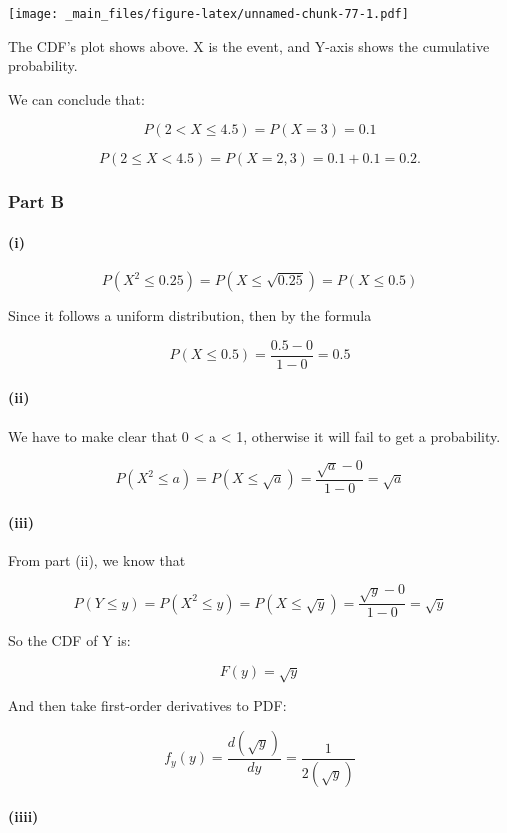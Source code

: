 \documentclass[
]{article}
\begin{document}
\texttt{[image: \_main\_files/figure-latex/unnamed-chunk-77-1.pdf]}

The CDF's plot shows above. X is the event, and Y-axis shows the cumulative probability.

We can conclude that:

\[
P(2< X ≤ 4.5) = P(X = 3) = 0.1
\]

\[
P(2 ≤ X < 4.5) = P(X = {2,3}) = 0.1 + 0.1 = 0.2.
\]

\hypertarget{part-b-6}{%
\subsubsection{Part B}\label{part-b-6}}

\hypertarget{i}{%
\paragraph{(i)}\label{i}}

\[
P(X^2 ≤ 0.25) = P (X ≤ \sqrt{0.25}) = P(X≤ 0.5)
\]

Since it follows a uniform distribution, then by the formula

\[
P(X≤ 0.5) = \frac{0.5-0}{1-0} = 0.5
\]

\hypertarget{ii}{%
\paragraph{(ii)}\label{ii}}

We have to make clear that 0 \textless{} a \textless{} 1, otherwise it will fail to get a probability.

\[
P(X^2 ≤ a) = P (X ≤ \sqrt{a}) = \frac{\sqrt{a}-0}{1-0} = \sqrt{a}
\]

\hypertarget{iii}{%
\paragraph{(iii)}\label{iii}}

From part (ii), we know that

\[
P(Y≤ y) = P(X^2 ≤ y) = P (X ≤ \sqrt{y}) = \frac{\sqrt{y}-0}{1-0} = \sqrt{y}
\]

So the CDF of Y is:

\[
F(y) = \sqrt{y}
\]

And then take first-order derivatives to PDF:

\[
f_y(y) = \frac{d(\sqrt{y})}{dy} = \frac{1}{2(\sqrt{y})}
\]

\hypertarget{iiii}{%
\paragraph{(iiii)}\label{iiii}}
\end{document}
